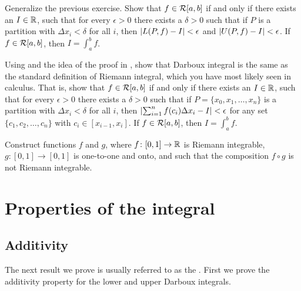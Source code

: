 \begin{exercise}[Challenging] \label{exercise:riemannintdarboux}
Generalize the previous exercise.
Show that $f \in {\mathcal{R}}[a,b]$ if and only if there exists an $I \in {\mathbb{R}}$,
such that for every $\epsilon > 0$ there exists
a $\delta > 0$ such that if $P$ is a partition with $\Delta x_i < \delta$
for all $i$, then
$\left\lvert {L(P,f) - I} \right\rvert < \epsilon$ and
$\left\lvert {U(P,f) - I} \right\rvert < \epsilon$.  If $f \in {\mathcal{R}}[a,b]$, then $I = \int_a^b f$.
\end{exercise}

\begin{exercise}
Using  and the idea of
the proof in , show that 
Darboux integral is the same as the standard definition
of Riemann integral, which you have most likely seen in calculus.  That is,
show that
$f \in {\mathcal{R}}[a,b]$ if and only if there exists an $I \in {\mathbb{R}}$,
such that for every $\epsilon > 0$ there exists
a $\delta > 0$ such that if $P = \{ x_0,x_1,\ldots,x_n \}$
is a partition with $\Delta x_i < \delta$
for all $i$, then
$\left\lvert {\sum_{i=1}^n f(c_i) \Delta x_i - I} \right\rvert < \epsilon$ for any set
$\{ c_1,c_2,\ldots,c_n \}$ with $c_i \in [x_{i-1},x_i]$.
If $f \in {\mathcal{R}}[a,b]$, then $I = \int_a^b f$.
\end{exercise}


\begin{exercise}[Challenging]
Construct functions $f$ and $g$, 
where
$f \colon [0,1] \to {\mathbb{R}}$ is Riemann integrable,
$g \colon [0,1] \to [0,1]$ is one-to-one and onto,
and such that the composition $f \circ g$ is not Riemann integrable.
\end{exercise}


\sectionnewpage
\section{Properties of the integral}
\label{sec:rintprop}


\subsection{Additivity}

The next result we prove is usually referred to as the
.  First we prove the additivity
property for the lower and upper Darboux integrals.


